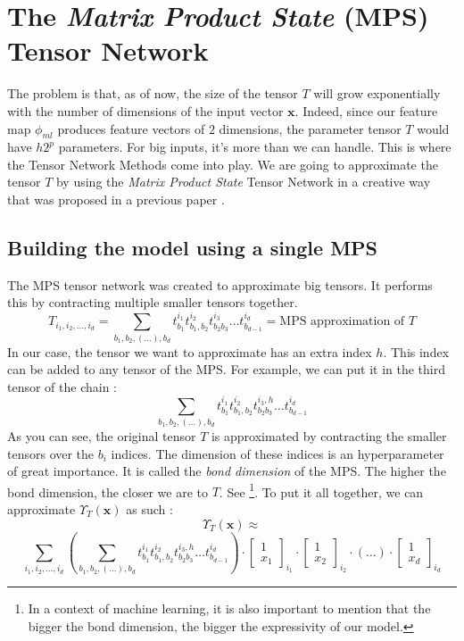 \documentclass{article}
\theoremstyle{definition}
\theoremstyle{definition}
\begin{document}
\section{The \emph{Matrix Product State} (MPS) Tensor Network}
The problem is that, as of now, the size of the tensor $T$ will grow exponentially with the number of dimensions of the input vector $\mathbf{x}$. Indeed, since our feature map $\phi_{ml}$ produces feature vectors of $2$ dimensions, the parameter tensor $T$ would have $h2^p$ parameters. For big inputs, it's more than we can handle. This is where the Tensor Network Methods come into play. We are going to approximate the tensor $T$ by using the \emph{Matrix Product State} Tensor Network in a creative way that was proposed in a previous paper \cite{stoudenmire2017supervised}.
\subsection{Building the model using a single MPS}
The MPS tensor network was created to approximate big tensors. It performs this by contracting multiple smaller tensors together.
\begin{equation} \label{eq:mps_approx}
T_{i_1, i_2, \dots, i_d} 
= 
\sum_{b_1,b_2,(\dots), b_d} t^{i_1}_{b_1} t^{i_2}_{b_1, b_2} t^{i_3}_{b_2 b_3} \dots  t^{i_d}_{ b_{d-1} } 
= \text{MPS approximation of $T$}
\end{equation}
In our case, the tensor we want to approximate has an extra index $h$. This index can be added to any tensor of the MPS. For example, we can put it in the third tensor of the chain :
\[
    \sum_{b_1,b_2,(\dots), b_d} t^{i_1}_{b_1} t^{i_2}_{b_1, b_2} t^{i_3, h}_{b_2 b_3} \dots  t^{i_d}_{ b_{d-1} } 
\]
As you can see, the original tensor $T$ is approximated by contracting the smaller tensors over the $b_i$ indices. The dimension of these indices is an hyperparameter of great importance. It is called the \emph{bond dimension} of the MPS. The higher the bond dimension, the closer we are to $T$. See \footnote{In a context of machine learning, it is also important to mention that the bigger the bond dimension, the bigger the expressivity of our model.}. To put it all together, we can approximate $\Upsilon_T(\mathbf{x})$ as such :
\[
    \Upsilon_T(\mathbf{x}) \approx
\]
\[
    \sum_{i_1, i_2, \dots, i_d}
    \left(
    \sum_{b_1,b_2,(\dots), b_d} t^{i_1}_{b_1} t^{i_2}_{b_1, b_2} t^{i_3, h}_{b_2 b_3} \dots  t^{i_d}_{ b_{d-1} } 
    \right)
    \cdot
    \begin{bmatrix}
        1 \\ x_1
    \end{bmatrix}_{i_1}
    \cdot
    \begin{bmatrix}
        1 \\ x_2
    \end{bmatrix}_{i_2}
    \cdot
    (\dots)
    \cdot
    \begin{bmatrix}
        1 \\ x_d
    \end{bmatrix}_{i_d}
\]
\end{document}
